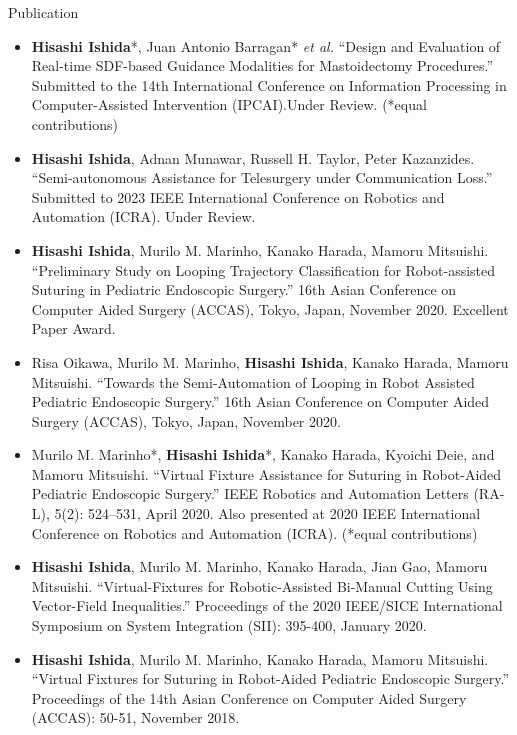 \documentclass{resume} %
\begin{document}
\begin{rSection}{Publication} 
\begin{itemize}
    \item \textbf{Hisashi Ishida}*, Juan Antonio Barragan* \textit{et al.} “Design and Evaluation of Real-time SDF-based Guidance Modalities for Mastoidectomy Procedures.” Submitted to the 14th International Conference on Information Processing in Computer-Assisted Intervention (IPCAI).Under Review. (*equal contributions)

\item \textbf{Hisashi Ishida}, Adnan Munawar, Russell H. Taylor, Peter Kazanzides. “Semi-autonomous Assistance for Telesurgery under Communication Loss.” Submitted to 2023 IEEE International Conference on Robotics and Automation (ICRA). Under Review.

\item \textbf{Hisashi Ishida}, Murilo M. Marinho, Kanako Harada, Mamoru Mitsuishi. “Preliminary Study on Looping Trajectory Classification for Robot-assisted Suturing in Pediatric Endoscopic Surgery.” 16th Asian Conference on Computer Aided Surgery (ACCAS), Tokyo, Japan, November 2020. Excellent Paper Award.

\item Risa Oikawa, Murilo M. Marinho, \textbf{Hisashi Ishida}, Kanako Harada, Mamoru Mitsuishi. “Towards the Semi-Automation of Looping in Robot Assisted Pediatric Endoscopic Surgery.” 16th Asian Conference on Computer Aided Surgery (ACCAS), Tokyo, Japan, November 2020.

\item Murilo M. Marinho*, \textbf{Hisashi Ishida}*, Kanako Harada, Kyoichi Deie, and Mamoru Mitsuishi. “Virtual Fixture Assistance for Suturing in Robot-Aided Pediatric Endoscopic Surgery.” IEEE Robotics and Automation Letters (RA-L), 5(2): 524–531, April 2020. Also presented at 2020 IEEE International Conference on Robotics and Automation (ICRA). (*equal contributions)

\item \textbf{Hisashi Ishida}, Murilo M. Marinho, Kanako Harada, Jian Gao, Mamoru Mitsuishi. “Virtual-Fixtures for Robotic-Assisted Bi-Manual Cutting Using Vector-Field Inequalities.” Proceedings of the 2020 IEEE/SICE International Symposium on System Integration (SII): 395-400, January 2020.

\item \textbf{Hisashi Ishida}, Murilo M. Marinho, Kanako Harada, Mamoru Mitsuishi. “Virtual Fixtures for Suturing in Robot-Aided Pediatric Endoscopic Surgery.” Proceedings of the 14th Asian Conference on Computer Aided Surgery (ACCAS): 50-51, November 2018.

\end{itemize}
\end{rSection}
\end{document}
